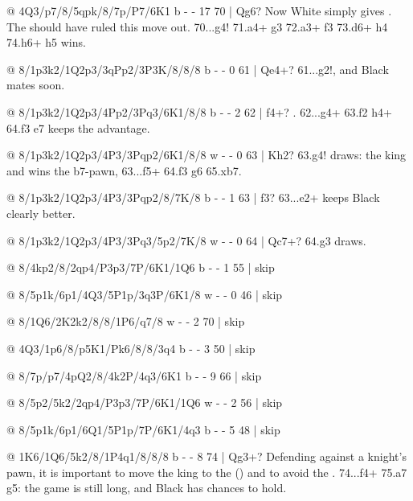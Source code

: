 @ 4Q3/p7/8/5qpk/8/7p/P7/6K1 b - - 17 70 | Qg6?
Now White simply gives . The
 should have ruled this
move out. 70...\K g4! 71.\Q a4+ \K g3 72.\Q a3+ \Q f3 73.\Q d6+ \K h4 74.\Q h6+ \Q h5 wins.

@ 8/1p3k2/1Q2p3/3qPp2/3P3K/8/8/8 b - - 0 61 | Qe4+?
61...\Q g2!, and Black mates soon.

@ 8/1p3k2/1Q2p3/4Pp2/3Pq3/6K1/8/8 b - - 2 62 | f4+?
. 62...\Q g4+ 63.\K f2 \Q h4+ 64.\K f3 \Q e7 keeps the
advantage.

@ 8/1p3k2/1Q2p3/4P3/3Pqp2/6K1/8/8 w - - 0 63 | Kh2?
63.\K g4! draws: the king  and wins the b7-pawn,
63...\Q f5+ 64.\K f3 \K g6 65.\Q xb7.

@ 8/1p3k2/1Q2p3/4P3/3Pqp2/8/7K/8 b - - 1 63 | f3?
63...\Q e2+ keeps Black clearly better.

@ 8/1p3k2/1Q2p3/4P3/3Pq3/5p2/7K/8 w - - 0 64 | Qc7+?
64.\K g3 draws.

@ 8/4kp2/8/2qp4/P3p3/7P/6K1/1Q6 b - - 1 55 | skip

@ 8/5p1k/6p1/4Q3/5P1p/3q3P/6K1/8 w - - 0 46 | skip

@ 8/1Q6/2K2k2/8/8/1P6/q7/8 w - - 2 70 | skip

@ 4Q3/1p6/8/p5K1/Pk6/8/8/3q4 b - - 3 50 | skip

@ 8/7p/p7/4pQ2/8/4k2P/4q3/6K1 b - - 9 66 | skip

@ 8/5p2/5k2/2qp4/P3p3/7P/6K1/1Q6 w - - 2 56 | skip

@ 8/5p1k/6p1/6Q1/5P1p/7P/6K1/4q3 b - - 5 48 | skip

@ 1K6/1Q6/5k2/8/1P4q1/8/8/8 b - - 8 74 | Qg3+?
Defending against a knight's pawn, it is important to move the king to the
 ()
and to avoid the .
74...\Q f4+ 75.\K a7 \K g5: the game is still long, and Black has chances to hold.

